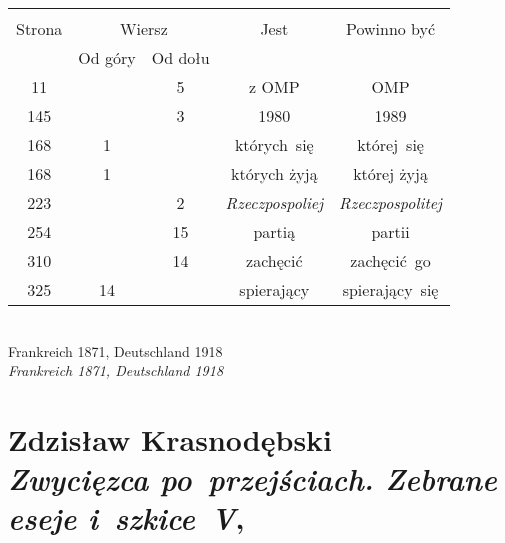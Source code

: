 \documentclass[a4paper,11pt]{article}
\numberwithin{equation}{section}
\begin{document}
\begin{center}

  \begin{tabular}{|c|c|c|c|c|}
    \hline
    & \multicolumn{2}{c|}{} & & \\
    Strona & \multicolumn{2}{c|}{Wiersz} & Jest
                              & Powinno być \\ \cline{2-3}
    & Od góry & Od dołu & & \\
    \hline
    11  & &  5 & z OMP & OMP \\
    145 & &  3 & 1980 & 1989 \\
    168 &  1 & & których~się & której~się \\
    168 &  1 & & których żyją & której żyją \\
    223 & &  2 & \textit{Rzeczpospoliej} & \textit{Rzeczpospolitej} \\
    254 & & 15 & partią & partii \\
    310 & & 14 & zachęcić & zachęcić~go \\
    325 & 14 & & spierający & spierający~się \\
    \hline
  \end{tabular}

\end{center}

\VerSpaceTwo


\noindent
{} \\
\Jest Frankreich 1871, Deutschland 1918 \\
\PowinnoByc \textit{Frankreich 1871, Deutschland 1918} \\













\section{ %
  Zdzisław Krasnodębski \\
  \textit{Zwycięzca po~przejściach. Zebrane eseje i~szkice~V},
  \cite{KrasnodebskiZwyciezcaPoPrzejsciach2012} }
\end{document}

